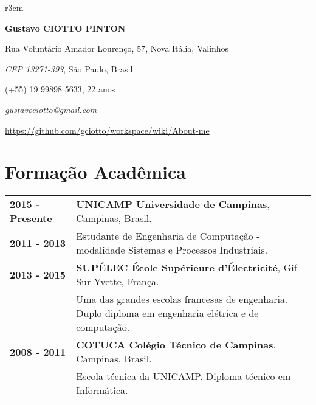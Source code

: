 \documentclass[10pt, a4paper]{article}
\author{Gustavo Ciotto Pinton}
\begin{document}
\pagestyle{empty} 

\begin{wrapfigure}{r}{3cm}
  \vspace{-20pt}
  \begin{center}
  \end{center}
\end{wrapfigure}

\textbf{\LARGE Gustavo CIOTTO PINTON}

Rua Voluntário Amador Lourenço, 57, Nova Itália, Valinhos

\textit{CEP 13271-393}, São Paulo, Brasil

(+55) 19 99898 5633, 22 anos

\textit{gustavociotto@gmail.com} 

\url{https://github.com/gciotto/workspace/wiki/About-me}



\section{Formação Acadêmica}

\begin{tabular}{p{} p{}}

 \textbf{2015 - Presente} & \textbf{UNICAMP Universidade de Campinas}, Campinas,
 Brasil.
 \\
 \textbf{2011 - 2013} & Estudante de Engenharia de Computação - modalidade
 Sistemas e Processos Industriais. \vspace{8pt}\\

 \textbf{2013 - 2015} & \textbf{SUPÉLEC  École Supérieure d'Électricité},
 Gif-Sur-Yvette, França. \\
 & Uma das grandes escolas francesas de engenharia. Duplo diploma em
 engenharia elétrica e de computação. \vspace{8pt}
 \\
  
 
 \textbf{2008 - 2011} & \textbf{COTUCA Colégio Técnico de Campinas}, Campinas,
 Brasil. \\
 & Escola técnica da UNICAMP. Diploma técnico em Informática. \\
\end{tabular}
\end{document}
